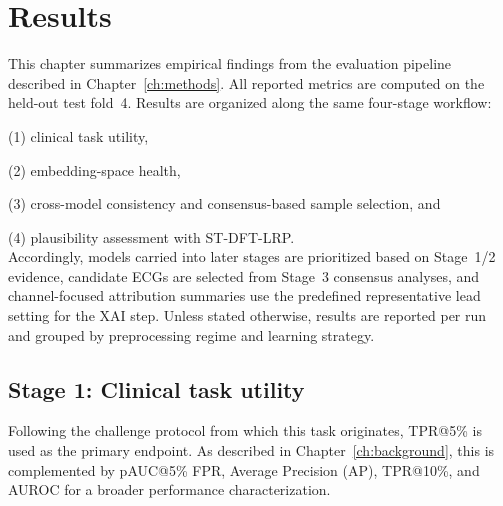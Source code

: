 \chapter{Results}
\label{ch:results}

This chapter summarizes empirical findings from the evaluation pipeline described in Chapter~\ref{ch:methods}.
All reported metrics are computed on the held-out test fold~4.
Results are organized along the same four-stage workflow:

(1) clinical task utility,

(2) embedding-space health,

(3) cross-model consistency and consensus-based sample selection, and

(4) plausibility assessment with ST-DFT-LRP.
\\
Accordingly, models carried into later stages are prioritized based on Stage~1/2 evidence, candidate ECGs are selected from Stage~3 consensus analyses, and channel-focused attribution summaries use the predefined representative lead setting for the XAI step.
Unless stated otherwise, results are reported per run and grouped by preprocessing regime and learning strategy.

\section{Stage 1: Clinical task utility}
Following the challenge protocol from which this task originates, TPR@5\% is used as the primary endpoint.
As described in Chapter~\ref{ch:background}, this is complemented by pAUC@5\% FPR, Average Precision (AP), TPR@10\%, and AUROC for a broader performance characterization.

